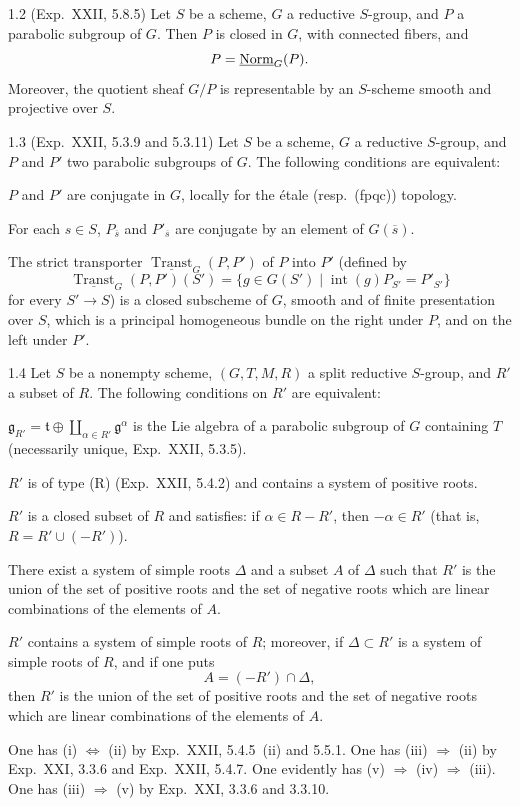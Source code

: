 \begin{proposition}{1.2 (Exp.~XXII, 5.8.5)}\label{XXVI.1.2}
Let $S$ be a scheme, $G$ a reductive $S$-group, and $P$ a parabolic subgroup of $G$. Then $P$ is closed in $G$, with connected fibers, and
\[
P=\underline{\mathrm{Norm}}_G(P).
\]
Moreover, the quotient sheaf $G/P$ is representable by an $S$-scheme smooth and projective over $S$.
\end{proposition}
\begin{proposition}{1.3 (Exp.~XXII, 5.3.9 and 5.3.11)}\label{XXVI.1.3}
Let $S$ be a scheme, $G$ a reductive $S$-group, and $P$ and $P'$ two parabolic subgroups of $G$. The following conditions are equivalent:
\begin{enumeratei}
\item $P$ and $P'$ are conjugate in $G$, locally for the \'etale (resp.~(fpqc)) topology.
\item For each $s\in S$, $P_{\overline s}$ and $P'_{\overline s}$ are conjugate by an element of $G(\overline s)$.
\item The strict transporter $\underline{\operatorname{Transt}}_G(P,P')$ of $P$ into $P'$ (defined by
\[
\underline{\operatorname{Transt}}_G(P,P')(S')=\{g\in G(S')\mid\operatorname{int}(g)P_{S'}=P'_{S'}\}
\]
for every $S'\to S$) is a closed subscheme of $G$, smooth and of finite presentation over $S$, which is a principal homogeneous bundle on the right under $P$, and on the left under $P'$.
\end{enumeratei}
\end{proposition}
\begin{proposition}{1.4}\label{XXVI.1.4}
Let $S$ be a nonempty scheme, $(G,T,M,R)$ a split reductive $S$-group, and $R'$ a subset of $R$. The following conditions on $R'$ are equivalent:
\begin{enumeratei}
\item $\mathfrak g_{R'}=\mathfrak t\oplus\coprod_{\alpha\in R'}\mathfrak g^\alpha$ is the Lie algebra of a parabolic subgroup of $G$ containing $T$ (necessarily unique, Exp.~XXII, 5.3.5).
\item $R'$ is of type (R) (Exp.~XXII, 5.4.2) and contains a system of positive roots.
\item $R'$ is a closed subset of $R$ and satisfies: if $\alpha\in R-R'$, then $-\alpha\in R'$ (that is, $R=R'\cup(-R')$).
\item There exist a system of simple roots $\Delta$ and a subset $A$ of $\Delta$ such that $R'$ is the union of the set of positive roots and the set of negative roots which are linear combinations of the elements of $A$.
\item $R'$ contains a system of simple roots of $R$; moreover, if $\Delta\subset R'$ is a system of simple roots of $R$, and if one puts
\[
A=(-R')\cap\Delta,
\]
then $R'$ is the union of the set of positive roots and the set of negative roots which are linear combinations of the elements of $A$.
\end{enumeratei}
\end{proposition}
One has (i) $\Leftrightarrow$ (ii) by Exp.~XXII, 5.4.5~(ii) and 5.5.1. One has (iii) $\Rightarrow$ (ii) by Exp.~XXI, 3.3.6 and Exp.~XXII, 5.4.7. One evidently has (v) $\Rightarrow$ (iv) $\Rightarrow$ (iii). One has (iii) $\Rightarrow$ (v) by Exp.~XXI, 3.3.6 and 3.3.10.

